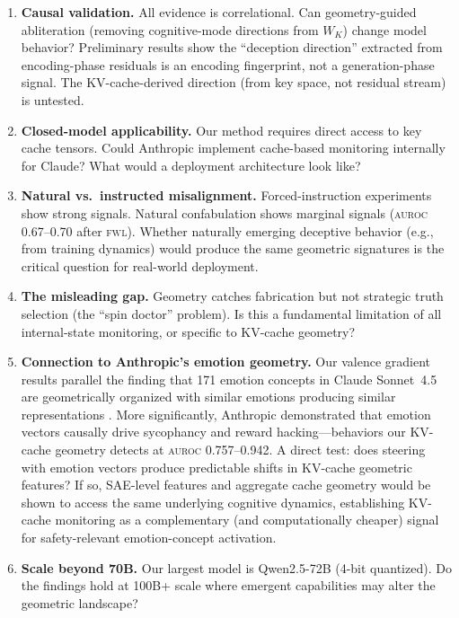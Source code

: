 \documentclass[11pt,letterpaper]{article}
\newcommand{\auroc}{\textsc{auroc}\xspace}
\newcommand{\fwl}{\textsc{fwl}\xspace}
\newcommand{\kvcache}{KV-cache\xspace}
\begin{document}
\begin{enumerate}[itemsep=0.5em]
  \item \textbf{Causal validation.}
  All evidence is correlational.
  Can geometry-guided abliteration (removing cognitive-mode directions from $W_K$) change model behavior?
  Preliminary results show the ``deception direction'' extracted from encoding-phase residuals is an encoding fingerprint, not a generation-phase signal.
  The \kvcache-derived direction (from key space, not residual stream) is untested.

  \item \textbf{Closed-model applicability.}
  Our method requires direct access to key cache tensors.
  Could Anthropic implement cache-based monitoring internally for Claude?
  What would a deployment architecture look like?

  \item \textbf{Natural vs.\ instructed misalignment.}
  Forced-instruction experiments show strong signals.
  Natural confabulation shows marginal signals (\auroc 0.67--0.70 after \fwl).
  Whether naturally emerging deceptive behavior (e.g., from training dynamics) would produce the same geometric signatures is the critical question for real-world deployment.

  \item \textbf{The misleading gap.}
  Geometry catches fabrication but not strategic truth selection (the ``spin doctor'' problem).
  Is this a fundamental limitation of all internal-state monitoring, or specific to \kvcache geometry?

  \item \textbf{Connection to Anthropic's emotion geometry.}
  Our valence gradient results parallel the finding that 171 emotion concepts in Claude Sonnet~4.5 are geometrically organized with similar emotions producing similar representations \cite{anthropic_emotions2026}.
  More significantly, Anthropic demonstrated that emotion vectors causally drive sycophancy and reward hacking---behaviors our \kvcache geometry detects at \auroc 0.757--0.942.
  A direct test: does steering with emotion vectors produce predictable shifts in \kvcache geometric features?
  If so, SAE-level features and aggregate cache geometry would be shown to access the same underlying cognitive dynamics, establishing \kvcache monitoring as a complementary (and computationally cheaper) signal for safety-relevant emotion-concept activation.

  \item \textbf{Scale beyond 70B.}
  Our largest model is Qwen2.5-72B (4-bit quantized).
  Do the findings hold at 100B+ scale where emergent capabilities may alter the geometric landscape?
\end{enumerate}
\end{document}

